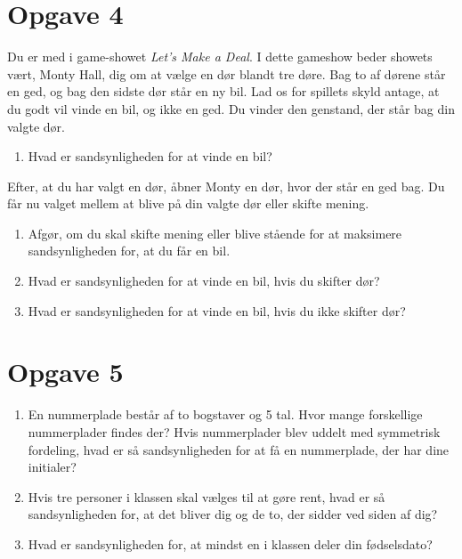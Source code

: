 \documentclass[12pt]{article}
\begin{document}
\section*{Opgave 4}
Du er med i game-showet \textit{Let's Make a Deal}. I dette gameshow beder showets vært, Monty Hall, dig om at vælge en dør blandt tre døre. Bag to af dørene står en ged, og bag den sidste dør står en ny bil. Lad os for spillets skyld antage, at du godt vil vinde en bil, og ikke en ged. Du vinder den genstand, der står bag din valgte dør. 
\begin{enumerate}[label=\roman*)]
\item Hvad er sandsynligheden for at vinde en bil?
\end{enumerate}
Efter, at du har valgt en dør, åbner Monty en dør, hvor der står en ged bag. Du får nu valget mellem at blive på din valgte dør eller skifte mening.
\begin{enumerate}[label=\roman*)]
\item Afgør, om du skal skifte mening eller blive stående for at maksimere sandsynligheden for, at du får en bil.
\item Hvad er sandsynligheden for at vinde en bil, hvis du skifter dør?
\item Hvad er sandsynligheden for at vinde en bil, hvis du ikke skifter dør?
\end{enumerate}

\section*{Opgave 5}
\begin{enumerate}[label=\roman*)]
\item En nummerplade består af to bogstaver og 5 tal. Hvor mange forskellige nummerplader findes der? Hvis nummerplader blev uddelt med symmetrisk fordeling, hvad er så sandsynligheden for at få en nummerplade, der har dine initialer?
\item Hvis tre personer i klassen skal vælges til at gøre rent, hvad er så sandsynligheden for, at det bliver dig og de to, der sidder ved siden af dig?
\item Hvad er sandsynligheden for, at mindst en i klassen deler din fødselsdato?
\end{enumerate}
\end{document}
